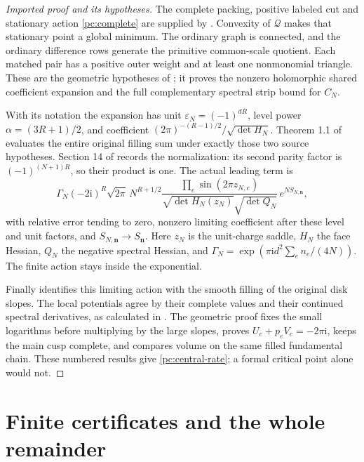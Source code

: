 \documentclass[11pt]{article}
\numberwithin{equation}{section}
\theoremstyle{definition}\newtheorem{definition}[theorem]{Definition}
\theoremstyle{remark}\newtheorem{remark}[theorem]{Remark}
\newcommand{\ii}{\mathrm i}
\newcommand{\calQ}{\mathcal Q}
\begin{document}
\begin{proof}[Imported proof and its hypotheses]
The complete packing, positive labeled cut and stationary action
\eqref{pc:complete} are supplied by \cite[Theorem 1.1, Proposition 2.1
and Section 3]{Geometry}. Convexity of \(\calQ\) makes that stationary
point a global minimum. The ordinary graph is connected, and the
ordinary difference rows generate the primitive common-scale
quotient. Each matched pair has a positive outer weight and at least
one nonmonomial triangle. These are the geometric hypotheses of
\cite[Theorem 8.1]{CasimirSources}; it proves the nonzero holomorphic shared
coefficient expansion and the full complementary spectral strip
bound for \(C_N\).

With its notation the expansion has unit
\(\varepsilon_N=(-1)^{dR}\), level power
\(\alpha=(3R+1)/2\), and coefficient
\((2\pi)^{-(R-1)/2}/\sqrt{\det H_N}\).
Theorem 1.1 of \cite{Oscillatory} evaluates the entire original
filling sum under exactly those two source hypotheses. Section 14
of \cite{CasimirSources} records the normalization: its second parity factor
is \((-1)^{(N+1)R}\), so their product is one. The actual leading
term is
\begin{equation}\label{pc:packet}
 \Gamma_N(-2\ii)^R\sqrt{2\pi}\,N^{R+1/2}
 \frac{\prod_e\sin(2\pi z_{N,e})}
 {\sqrt{\det H_N(z_N)}\sqrt{\det Q_N}}\,
                         e^{NS_{N,\boldsymbol n}},
\end{equation}
with relative error tending to zero, nonzero limiting coefficient
after these level and unit factors, and
\(S_{N,\boldsymbol n}\to S_{\boldsymbol n}\).
Here \(z_N\) is the unit-charge saddle, \(H_N\) the face Hessian,
\(Q_N\) the negative spectral Hessian, and
\(\Gamma_N=\exp(\pi\ii d^2\sum_e n_e/(4N))\).
The finite action stays inside the exponential.

Finally \cite[Theorem 1.1 and Corollary 8.1]{Geometry} identifies this
limiting action with the smooth filling of the original disk slopes.
The local potentials agree by their complete values and their
continued spectral derivatives, as calculated in
\cite[Lemma 5.1]{CasimirSources}. The geometric proof fixes the small
logarithms before multiplying by the large slopes, proves
\(U_e+p_eV_e=-2\pi\ii\), keeps the main cusp complete, and compares
volume on the same filled fundamental chain. These numbered results
give \eqref{pc:central-rate}; a formal critical point alone would not.
\end{proof}

\section{Finite certificates and the whole remainder}
\end{document}
